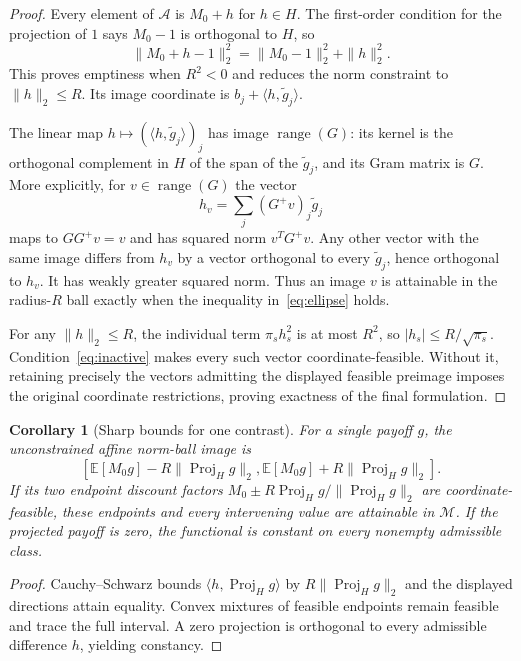 \documentclass[11pt,a4paper]{article}
\newtheorem{corollary}[theorem]{Corollary}
\theoremstyle{definition}
\theoremstyle{remark}
\newcommand{\E}{\mathbb E}
\begin{document}
\begin{proof}
Every element of $\mathcal A$ is $M_0+h$ for $h\in H$. The first-order condition for the projection of $1$ says $M_0-1$ is orthogonal to $H$, so
\[
 \|M_0+h-1\|_2^2=\|M_0-1\|_2^2+\|h\|_2^2.
\]
This proves emptiness when $R^2<0$ and reduces the norm constraint to $\|h\|_2\leq R$. Its image coordinate is $b_j+\langle h,\widetilde g_j\rangle$.

The linear map $h\mapsto(\langle h,\widetilde g_j\rangle)_j$ has image $\operatorname{range}(G)$: its kernel is the orthogonal complement in $H$ of the span of the $\widetilde g_j$, and its Gram matrix is $G$. More explicitly, for $v\in\operatorname{range}(G)$ the vector
\[
 h_v=\sum_j(G^+v)_j\widetilde g_j
\]
maps to $GG^+v=v$ and has squared norm $v^TG^+v$. Any other vector with the same image differs from $h_v$ by a vector orthogonal to every $\widetilde g_j$, hence orthogonal to $h_v$. It has weakly greater squared norm. Thus an image $v$ is attainable in the radius-$R$ ball exactly when the inequality in~\eqref{eq:ellipse} holds.

For any $\|h\|_2\leq R$, the individual term $\pi_sh_s^2$ is at most $R^2$, so $|h_s|\leq R/\sqrt{\pi_s}$. Condition~\eqref{eq:inactive} makes every such vector coordinate-feasible. Without it, retaining precisely the vectors admitting the displayed feasible preimage imposes the original coordinate restrictions, proving exactness of the final formulation.
\end{proof}

\begin{corollary}[Sharp bounds for one contrast]
For a single payoff $g$, the unconstrained affine norm-ball image is
\[
 \left[\E[M_0g]-R\|\operatorname{Proj}_Hg\|_2,
       \E[M_0g]+R\|\operatorname{Proj}_Hg\|_2\right].
\]
If its two endpoint discount factors
$M_0\pm R\operatorname{Proj}_Hg/\|\operatorname{Proj}_Hg\|_2$
are coordinate-feasible, these endpoints and every intervening value are attainable in $\mathcal M$. If the projected payoff is zero, the functional is constant on every nonempty admissible class.
\end{corollary}
\begin{proof}
Cauchy--Schwarz bounds $\langle h,\operatorname{Proj}_Hg\rangle$ by $R\|\operatorname{Proj}_Hg\|_2$ and the displayed directions attain equality. Convex mixtures of feasible endpoints remain feasible and trace the full interval. A zero projection is orthogonal to every admissible difference $h$, yielding constancy.
\end{proof}
\end{document}
